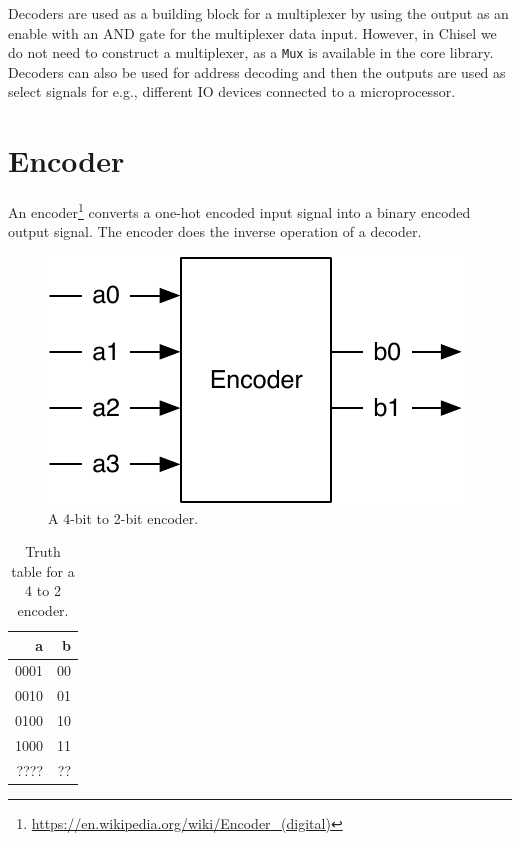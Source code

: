 \documentclass[%
    10pt,
    headinclude, footexclude,
    openright, %
    notitlepage,
    cleardoubleempty,
    headsepline,
    pointlessnumbers,
    bibtotoc, idxtotoc,
    ]{scrbook}
\newcommand{\code}[1]{{\small{\texttt{#1}}}}
\newcommand{\scale}{0.7}
\newcommand{\myref}[2]{\href{#1}{#2}}
\renewcommand{\myref}[2]{{#2}{\footnote{\url{#1}}}}
\begin{document}

Decoders are used as a building block for a multiplexer by using the output as an enable
with an AND gate for the multiplexer data input. However, in Chisel we do not need to construct
a multiplexer, as a \code{Mux} is available in the core library.
Decoders can also be used for address decoding and then the outputs are used as
select signals for e.g., different IO devices connected to a microprocessor. 


\section{Encoder}

An \myref{https://en.wikipedia.org/wiki/Encoder_(digital)}{encoder}
converts a one-hot encoded input signal into a binary encoded output signal.
The encoder does the inverse operation of a decoder.

\begin{figure}
  \centering
  \includegraphics[scale=\scale]{figures/encoder}
  \caption{A 4-bit to 2-bit encoder.}
  \label{fig:encoder}
\end{figure}


\begin{table}
 \centering
 \label{tab:encoder}
  \begin{tabular}{rr}
    \toprule
    a & b \\
    \midrule
    0001 & 00 \\
    0010 & 01 \\
    0100 & 10 \\
    1000 & 11 \\
    ???? & ?? \\
    \bottomrule 
  \end{tabular} 
  \caption{Truth table for a 4 to 2 encoder.}
\end{table}
\end{document}
